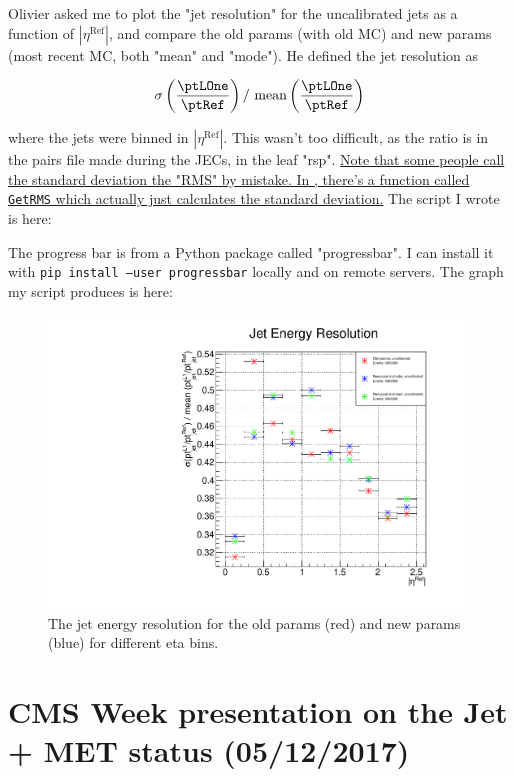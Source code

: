 Olivier asked me to plot the "jet resolution" for the uncalibrated jets as a function of $|\eta^{\mathrm{Ref}}|$, and compare the old params (with old MC) and new params (most recent MC, both "mean" and "mode"). He defined the jet resolution as

\begin{equation}
\sigma\left( \frac{ \ptLOne }{ \ptRef } \right) /  \ \textrm{mean} \left( \frac{ \ptLOne }{ \ptRef } \right)
\end{equation}

where the jets were binned in $|\eta^{\mathrm{Ref}}|$. This wasn't too difficult, as the \pt ratio is in the pairs file made during the JECs, in the leaf "rsp". \uline{Note that some people call the standard deviation the "RMS" by mistake. In \ROOT, there's a function called \texttt{GetRMS} which actually just calculates the standard deviation.} The script I wrote is here:



The progress bar is from a Python package called "progressbar". I can install it with \texttt{pip install --user progressbar} locally and on remote servers. The graph my script produces is here:

\begin{figure}[htbp]
\centering
\includegraphics[width=110mm]{figures/jet_energy_resolution.pdf}
\caption{The jet energy resolution for the old params (red) and new params (blue) for different eta bins.}
\end{figure}


\section{CMS Week presentation on the Jet + MET status (05/12/2017)}


